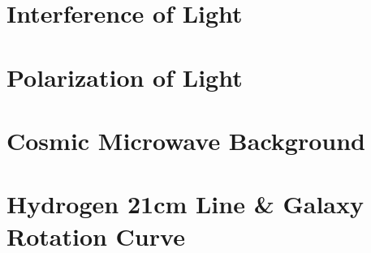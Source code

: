 \clearpage

\section{Interference of Light}

\clearpage

\section{Polarization of Light}

\clearpage

\section{Cosmic Microwave Background}

\clearpage

\section{Hydrogen 21cm Line \& Galaxy Rotation Curve}
